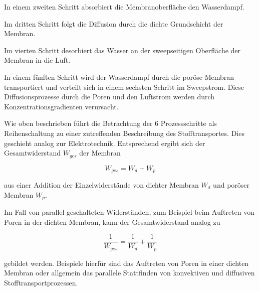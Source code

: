\begin{normalsize}
In einem zweiten Schritt absorbiert die Membranoberfläche den Wasserdampf. 

Im dritten Schritt folgt die Diffusion durch die dichte Grundschicht der Membran. 

Im vierten Schritt desorbiert das Wasser an der sweepseitigen Oberfläche der Membran in die Luft. 

In einem fünften Schritt wird der Wasserdampf durch die poröse Membran transportiert und verteilt sich in einem sechsten Schritt im Sweepstrom. Diese Diffusionsprozesse durch die Poren und den Luftstrom werden durch Konzentrationsgradienten verursacht.


Wie oben beschrieben führt die Betrachtung der 6 Prozessschritte als Reihenschaltung zu einer zutreffenden Beschreibung des Stofftransportes. Dies geschieht analog zur Elektrotechnik. Entsprechend ergibt sich der Gesamtwiderstand $W_{ges}$ der Membran 

\begin{equation}
 W_{ges} = W_{d} + W_{p}
\end{equation} 
 
aus einer Addition der Einzelwiderstände von dichter Membran $W_{d}$ und poröser Membran $W_{p}$.
 
Im Fall von parallel geschalteten Widerständen, zum Beispiel beim Auftreten von Poren in der dichten Membran, kann der Gesamtwiderstand analog zu 

\begin{equation}
\frac{1}{W_{ges}} = \frac{1}{W_{d}} + \frac{1}{W_{p}}
\end{equation}

gebildet werden. Beispiele hierfür sind das Auftreten von Poren in einer dichten Membran oder allgemein das parallele Stattfinden von konvektiven und diffusiven Stofftransportprozessen.



\end{normalsize}
